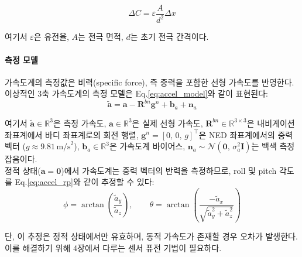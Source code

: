                 \begin{equation}
                    \Delta C = \varepsilon \frac{A}{d^2} \Delta x
                    \label{eq:accel_cap}
                \end{equation}

                \noindent 여기서 $\varepsilon$은 유전율, $A$는 전극 면적, $d$는 초기 전극 간격이다.\\

            \paragraph{측정 모델}
                가속도계의 측정값은 비력(specific force), 즉 중력을 포함한 선형 가속도를 반영한다. 이상적인 3축 가속도계의 측정 모델은 Eq.\ref{eq:accel_model}와 같이 표현된다:\\

                \begin{equation}
                    \tilde{\mathbf{a}} = \mathbf{a} - \mathbf{R}^{bn}\mathbf{g}^n + \mathbf{b}_a + \mathbf{n}_a
                    \label{eq:accel_model}
                \end{equation}

                \noindent 여기서 $\tilde{\mathbf{a}} \in \mathbb{R}^3$은 측정 가속도, $\mathbf{a} \in \mathbb{R}^3$은 실제 선형 가속도, $\mathbf{R}^{bn} \in \mathbb{R}^{3\times 3}$은 내비게이션 좌표계에서 바디 좌표계로의 회전 행렬, $\mathbf{g}^n = [0,\, 0,\, g]^\top$은 NED 좌표계에서의 중력 벡터 ($g \approx 9.81\,\text{m/s}^2$), $\mathbf{b}_a \in \mathbb{R}^3$은 가속도계 바이어스, $\mathbf{n}_a \sim \mathcal{N}(\mathbf{0},\, \sigma_a^2 \mathbf{I})$는 백색 측정 잡음이다.\\

                정적 상태($\mathbf{a} = \mathbf{0}$)에서 가속도계는 중력 벡터의 반력을 측정하므로, roll 및 pitch 각도를 Eq.\ref{eq:accel_rp}와 같이 추정할 수 있다:\\

                \begin{equation}
                    \phi = \arctan\!\left(\frac{\tilde{a}_y}{\tilde{a}_z}\right), \qquad
                    \theta = \arctan\!\left(\frac{-\tilde{a}_x}{\sqrt{\tilde{a}_y^2 + \tilde{a}_z^2}}\right)
                    \label{eq:accel_rp}
                \end{equation}

                단, 이 추정은 정적 상태에서만 유효하며, 동적 가속도가 존재할 경우 오차가 발생한다. 이를 해결하기 위해 4장에서 다루는 센서 퓨전 기법이 필요하다.\\

